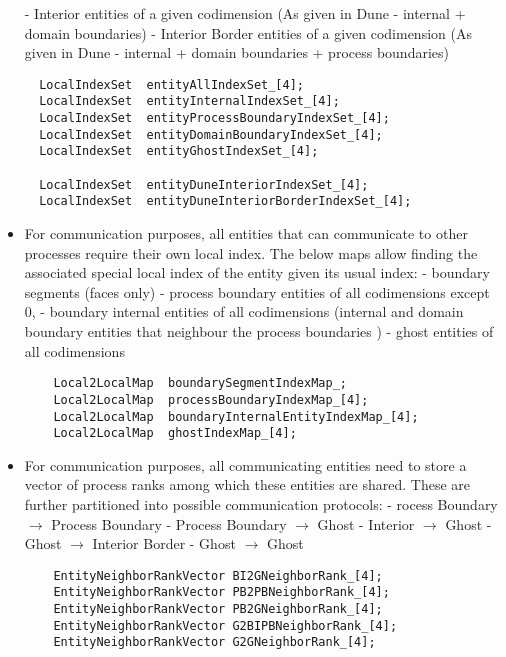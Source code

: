 \begin{itemize}
        \subitem - Interior entities of a given codimension (As given in Dune - internal + domain boundaries)
        \subitem - Interior Border entities of a given codimension (As given in Dune - internal + domain boundaries + process boundaries)
        
\begin{mybox}
\begin{lstlisting}
  LocalIndexSet  entityAllIndexSet_[4];
  LocalIndexSet  entityInternalIndexSet_[4];
  LocalIndexSet  entityProcessBoundaryIndexSet_[4];
  LocalIndexSet  entityDomainBoundaryIndexSet_[4];
  LocalIndexSet  entityGhostIndexSet_[4];
    
  LocalIndexSet  entityDuneInteriorIndexSet_[4];
  LocalIndexSet  entityDuneInteriorBorderIndexSet_[4];
\end{lstlisting}
\end{mybox}

    \item For communication purposes, all entities that can communicate to other processes require their own local index. The below maps allow finding the associated special local index of the entity given its usual index:
        \subitem - boundary segments (faces only)
        \subitem - process boundary entities of all codimensions except 0, 
        \subitem - boundary internal entities of all codimensions (internal and domain boundary entities that neighbour the process boundaries )
        \subitem - ghost entities of all codimensions
        
\begin{mybox}
\begin{lstlisting}
    Local2LocalMap  boundarySegmentIndexMap_;
    Local2LocalMap  processBoundaryIndexMap_[4];
    Local2LocalMap  boundaryInternalEntityIndexMap_[4];
    Local2LocalMap  ghostIndexMap_[4];
\end{lstlisting}
\end{mybox}


    \item For communication purposes, all communicating entities need to store a vector of process ranks among which these entities are shared. These are further partitioned into possible communication protocols:
        \subitem - rocess Boundary $\rightarrow$ Process Boundary
        \subitem - Process Boundary $\rightarrow$ Ghost
        \subitem - Interior $\rightarrow$ Ghost
        \subitem - Ghost $\rightarrow$ Interior Border
        \subitem - Ghost $\rightarrow$ Ghost        

\begin{mybox}
\begin{lstlisting}
    EntityNeighborRankVector BI2GNeighborRank_[4];
    EntityNeighborRankVector PB2PBNeighborRank_[4];
    EntityNeighborRankVector PB2GNeighborRank_[4];
    EntityNeighborRankVector G2BIPBNeighborRank_[4];
    EntityNeighborRankVector G2GNeighborRank_[4];
\end{lstlisting}
\end{mybox}



\end{itemize}


